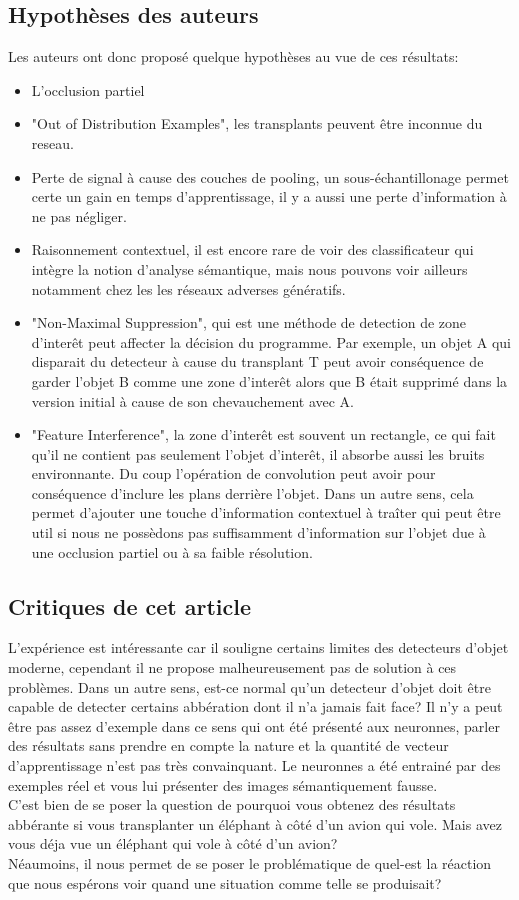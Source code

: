 \documentclass[12pt, letterpaper]{article}
\begin{document}
\subsection{Hypothèses des auteurs}
Les auteurs ont donc proposé quelque hypothèses au vue de ces résultats:
\begin{itemize}
    \item L'occlusion partiel
    \item "Out of Distribution Examples", les transplants peuvent être inconnue du reseau.
    \item Perte de signal à cause des couches de pooling, un sous-échantillonage permet certe un gain en temps d'apprentissage, il y a aussi une perte d'information à ne pas négliger.
    \item Raisonnement contextuel, il est encore rare de voir des classificateur qui intègre la notion d'analyse sémantique, mais nous pouvons voir ailleurs notamment chez les
        les réseaux adverses génératifs.
    \item "Non-Maximal Suppression", qui est une méthode de detection de zone d'interêt peut affecter la décision du programme.
        Par exemple, un objet A qui disparait du detecteur à cause du transplant T peut avoir conséquence de garder l'objet B comme une zone d'interêt alors que B était supprimé dans la version initial à cause de son 
        chevauchement avec A.
    \item "Feature Interference", la zone d'interêt est souvent un rectangle, ce qui fait qu'il ne contient pas seulement l'objet d'interêt, il absorbe aussi les bruits environnante. Du coup l'opération 
    de convolution peut avoir pour conséquence d'inclure les plans derrière l'objet. Dans un autre sens, cela permet d'ajouter une touche d'information contextuel à traîter qui peut être util si nous ne possèdons 
    pas suffisamment d'information sur l'objet due à une occlusion partiel ou à sa faible résolution.
\end{itemize}
\subsection{Critiques de cet article}
L'expérience est intéressante car il souligne certains limites des detecteurs d'objet moderne, cependant il ne propose malheureusement pas de solution à ces problèmes.
Dans un autre sens, est-ce normal qu'un detecteur d'objet doit être capable de detecter certains abbération dont il n'a jamais fait face? 
Il n'y a peut être pas assez d'exemple dans ce sens qui ont été présenté aux neuronnes, parler des résultats sans prendre en compte la nature et la quantité 
de vecteur d'apprentissage n'est pas très convainquant. Le neuronnes a été entrainé par des exemples réel et vous lui présenter des images sémantiquement fausse.\\
C'est bien de se poser la question de pourquoi vous obtenez des résultats abbérante si vous transplanter un éléphant à côté d'un avion qui vole. Mais avez vous déja vue 
un éléphant qui vole à côté d'un avion? \\
Néaumoins, il nous permet de se poser le problématique de quel-est la réaction que nous espérons voir quand une situation comme telle se produisait? 
\end{document}
